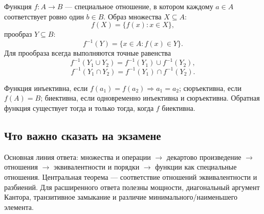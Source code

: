 Функция $f\colon A\to B$ --- специальное отношение, в котором каждому
$a\in A$ соответствует ровно один $b\in B$. Образ множества $X\subseteq A$:
\[
    f(X)=\{f(x):x\in X\},
\]
прообраз $Y\subseteq B$:
\[
    f^{-1}(Y)=\{x\in A:f(x)\in Y\}.
\]
Для прообраза всегда выполняются точные равенства
\[
 f^{-1}(Y_1\cup Y_2)=f^{-1}(Y_1)\cup f^{-1}(Y_2),
\]
\[
 f^{-1}(Y_1\cap Y_2)=f^{-1}(Y_1)\cap f^{-1}(Y_2).
\]

Функция инъективна, если $f(a_1)=f(a_2)\Rightarrow a_1=a_2$; сюръективна, если
$f(A)=B$; биективна, если одновременно инъективна и сюръективна. Обратная
функция существует тогда и только тогда, когда $f$ биективна.

\subsection{Что важно сказать на экзамене}

Основная линия ответа: множества и операции $\to$ декартово произведение $\to$
отношения $\to$ эквивалентности и порядки $\to$ функции как специальные
отношения. Центральная теорема --- соответствие отношений эквивалентности и
разбиений. Для расширенного ответа полезны мощности, диагональный аргумент
Кантора, транзитивное замыкание и различие минимального/наименьшего элемента.

\newpage
